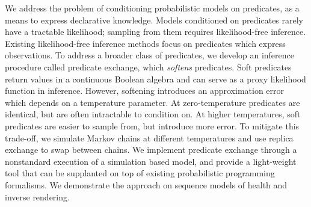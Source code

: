 We address the problem of conditioning probabilistic models on predicates, as a means to express declarative knowledge.
Models conditioned on predicates rarely have a tractable likelihood; sampling from them requires likelihood-free inference.
Existing likelihood-free inference methods
focus on predicates which express observations.
To address a broader class of predicates, we develop an inference procedure called predicate exchange, which \emph{softens} predicates.
Soft predicates return values in a continuous Boolean algebra and can serve as a proxy likelihood function in inference.
However, softening introduces an approximation error which depends on a temperature parameter.
At zero-temperature predicates are identical, but are often intractable to condition on.
At higher temperatures, soft predicates are easier to sample from, but introduce more error. 
To mitigate this trade-off, we simulate Markov chains at different temperatures and use 
replica exchange to swap between chains.
We implement predicate exchange through a nonstandard execution of a simulation based model, and provide a light-weight tool that can be supplanted on top of existing probabilistic programming formalisms. 
We demonstrate the approach on sequence models of health and inverse rendering.



% 